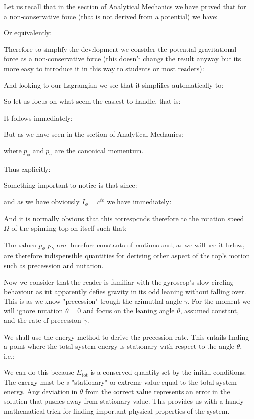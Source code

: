 	Let us recall that in the section of Analytical Mechanics we have proved that for a non-conservative force (that is not derived from a potential) we have:
	
	Or equivalently:
	
	Therefore to simplify the development we consider the potential gravitational force as a non-conservative force (this doesn't change the result anyway but its more easy to introduce it in this way to students or most readers):
	
	And looking to our Lagrangian we see that it simplifies automatically to:
	
	So let us focus on what seem the easiest to handle, that is:
	
	It follows immediately:
	
	But as we have seen in the section of Analytical Mechanics:
	
	where $p_\phi$ and $p_\gamma$ are the canonical momentum.
	
	Thus explicitly:
	
	Something important to notice is that since:
	
	and as we have obviously $I_\phi=c^{te}$ we have immediately:
	
	And it is normally obvious that this corresponds therefore to the rotation speed $\Omega$ of the spinning top on itself such that:
	
	The values $p_\phi,p_\gamma$ are therefore constants of motions and, as we will see it below, are therefore indispensible quantities for deriving other aspect of the top's motion such as precesssion and nutation.

	Now we consider that the reader is familiar with the gyroscop's slow circling behaviour as int apparently defies gravity in its odd leaning without falling over. This is as we know "precession" trough the azimuthal angle $\gamma$. For the moment we will ignore nutation $\dot{\theta}=0$ and focus on the leaning angle $\theta$, assumed constant, and the rate of precession $\dot{\gamma}$.

	We shall use the energy method to derive the precession rate. This entails finding a point where the total system energy is stationary with respect to the angle $\theta$, i.e.:
	
	We can do this because $E_{\text{tot}}$ is a conserved quantity set by the initial conditions. The energy must be a "stationary" or extreme value equal to the total system energy. Any deviation in $\theta$ from the correct value represents an error in the solution that pushes away from stationary value. This provides us with a handy mathematical trick for finding important physical properties of the system.

